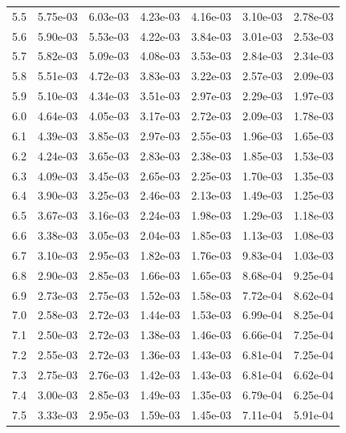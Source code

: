 \begin{table}[h!]
{\begin{tabular}{|c|c|c|c|c|c|c|}
5.5 & 5.75e-03 & 6.03e-03 & 4.23e-03 & 4.16e-03 & 3.10e-03 & 2.78e-03\\
5.6 & 5.90e-03 & 5.53e-03 & 4.22e-03 & 3.84e-03 & 3.01e-03 & 2.53e-03\\
5.7 & 5.82e-03 & 5.09e-03 & 4.08e-03 & 3.53e-03 & 2.84e-03 & 2.34e-03\\
5.8 & 5.51e-03 & 4.72e-03 & 3.83e-03 & 3.22e-03 & 2.57e-03 & 2.09e-03\\
5.9 & 5.10e-03 & 4.34e-03 & 3.51e-03 & 2.97e-03 & 2.29e-03 & 1.97e-03\\
6.0 & 4.64e-03 & 4.05e-03 & 3.17e-03 & 2.72e-03 & 2.09e-03 & 1.78e-03\\
6.1 & 4.39e-03 & 3.85e-03 & 2.97e-03 & 2.55e-03 & 1.96e-03 & 1.65e-03\\
6.2 & 4.24e-03 & 3.65e-03 & 2.83e-03 & 2.38e-03 & 1.85e-03 & 1.53e-03\\
6.3 & 4.09e-03 & 3.45e-03 & 2.65e-03 & 2.25e-03 & 1.70e-03 & 1.35e-03\\
6.4 & 3.90e-03 & 3.25e-03 & 2.46e-03 & 2.13e-03 & 1.49e-03 & 1.25e-03\\
6.5 & 3.67e-03 & 3.16e-03 & 2.24e-03 & 1.98e-03 & 1.29e-03 & 1.18e-03\\
6.6 & 3.38e-03 & 3.05e-03 & 2.04e-03 & 1.85e-03 & 1.13e-03 & 1.08e-03\\
6.7 & 3.10e-03 & 2.95e-03 & 1.82e-03 & 1.76e-03 & 9.83e-04 & 1.03e-03\\
6.8 & 2.90e-03 & 2.85e-03 & 1.66e-03 & 1.65e-03 & 8.68e-04 & 9.25e-04\\
6.9 & 2.73e-03 & 2.75e-03 & 1.52e-03 & 1.58e-03 & 7.72e-04 & 8.62e-04\\
7.0 & 2.58e-03 & 2.72e-03 & 1.44e-03 & 1.53e-03 & 6.99e-04 & 8.25e-04\\
7.1 & 2.50e-03 & 2.72e-03 & 1.38e-03 & 1.46e-03 & 6.66e-04 & 7.25e-04\\
7.2 & 2.55e-03 & 2.72e-03 & 1.36e-03 & 1.43e-03 & 6.81e-04 & 7.25e-04\\
7.3 & 2.75e-03 & 2.76e-03 & 1.42e-03 & 1.43e-03 & 6.81e-04 & 6.62e-04\\
7.4 & 3.00e-03 & 2.85e-03 & 1.49e-03 & 1.35e-03 & 6.79e-04 & 6.25e-04\\
7.5 & 3.33e-03 & 2.95e-03 & 1.59e-03 & 1.45e-03 & 7.11e-04 & 5.91e-04\\
      \hline
    \end{tabular}}
\end{table}